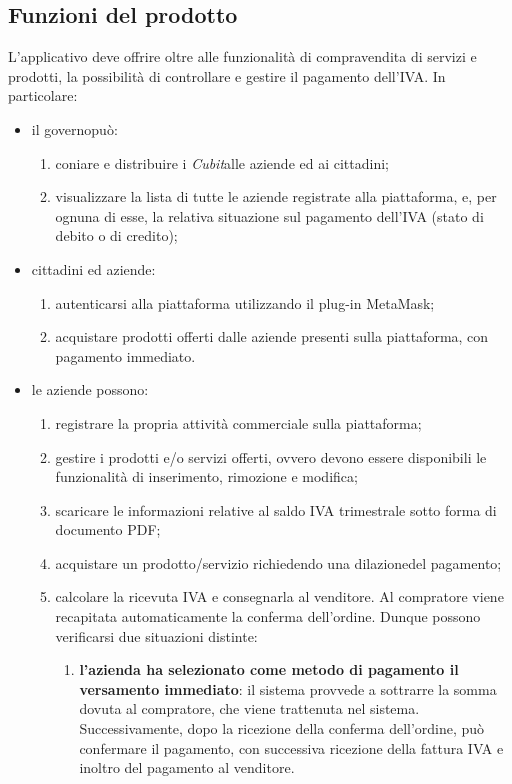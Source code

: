 \subsection{Funzioni del prodotto}
L'applicativo deve offrire oltre alle funzionalità di compravendita di servizi e prodotti, la possibilità di controllare e gestire il pagamento dell'IVA. In particolare: 
\begin{itemize}
	\item il governo\glosp può:
	\begin{enumerate}[label=\alph*.]
		\item coniare e distribuire i \textit{Cubit}\glosp alle aziende ed ai cittadini;
		\item visualizzare la lista di tutte le aziende registrate alla piattaforma, e, per ognuna di esse, la relativa situazione sul pagamento dell'IVA (stato di debito o di credito); 
	\end{enumerate}
	\item cittadini ed aziende:
	\begin{enumerate}[label=\alph*.]
		\item autenticarsi alla piattaforma utilizzando il plug-in MetaMask\glo;
		\item acquistare prodotti offerti dalle aziende presenti sulla piattaforma, con pagamento immediato. 
	\end{enumerate}
	\item le aziende possono:
	\begin{enumerate}[label=\alph*.]
		\item registrare la propria attività commerciale sulla piattaforma;
		\item gestire i prodotti e/o servizi offerti, ovvero devono essere disponibili le funzionalità di inserimento, rimozione e modifica;
		\item scaricare le informazioni relative al saldo IVA trimestrale sotto forma di documento PDF;
		\item acquistare un prodotto/servizio richiedendo una dilazione\glosp del pagamento;
		\item calcolare la ricevuta IVA e consegnarla al venditore. Al compratore viene recapitata automaticamente la conferma dell'ordine. Dunque possono verificarsi due situazioni distinte:
		\begin{enumerate}[label=\roman*.]
			\item \textbf{l'azienda ha selezionato come metodo di pagamento il versamento immediato}: il sistema provvede a sottrarre la somma dovuta al compratore, che viene trattenuta nel sistema. Successivamente, dopo la ricezione della conferma dell'ordine, può confermare il pagamento, con successiva ricezione della fattura IVA e inoltro del pagamento al venditore. 

\end{enumerate}
\end{enumerate}
\end{itemize}
